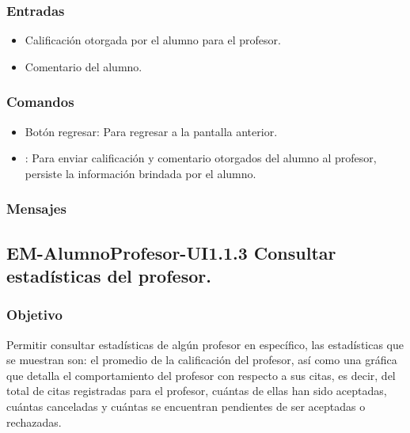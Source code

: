 \subsubsection{Entradas}
	\noindent
	\begin{itemize}
		\item Calificación otorgada por el alumno para el profesor.
		\item Comentario del alumno.
	\end{itemize}

\subsubsection{Comandos}
\begin{itemize}
	\item Botón regresar: Para regresar a la pantalla anterior.
	\item {}: Para enviar calificación y comentario otorgados del alumno al profesor, persiste la información brindada por el alumno.
\end{itemize}

\subsubsection{Mensajes}
\begin{Citemize}
	\item {}
	\item {}
\end{Citemize}


\subsection{EM-AlumnoProfesor-UI1.1.3 Consultar estadísticas del profesor.}

\subsubsection{Objetivo}
	\noindent
	Permitir consultar estadísticas de algún profesor en específico, las estadísticas que se muestran son: el promedio de la calificación del profesor, así como una gráfica que detalla el comportamiento del profesor con respecto a sus citas, es decir, del total de citas registradas para el profesor, cuántas de ellas han sido aceptadas, cuántas canceladas y cuántas se encuentran pendientes de ser aceptadas o rechazadas. 

